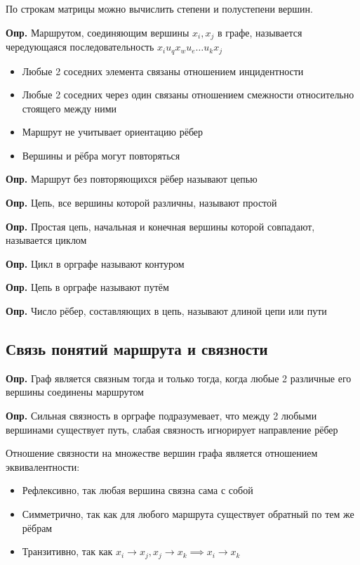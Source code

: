 \documentclass[10pt]{article}
\begin{document}
\par По строкам матрицы можно вычислить степени и полустепени вершин.


\par\textbf{Опр.} Маршрутом, соединяющим вершины $x_{i}, x_{j}$ в графе, называется чередующаяся последовательность $x_{i}u_{q}x_{w}u_{e}\dots u_{k}x_{j}$
\begin{itemize}
    \item Любые 2 соседних элемента связаны отношением инцидентности
    \item Любые 2 соседних через один связаны отношением смежности относительно стоящего между ними
    \item Маршрут не учитывает ориентацию рёбер
    \item Вершины и рёбра могут повторяться
\end{itemize}

\par\textbf{Опр.} Маршрут без повторяющихся рёбер называют цепью
\par\textbf{Опр.} Цепь, все вершины которой различны, называют простой
\par\textbf{Опр.} Простая цепь, начальная и конечная вершины которой совпадают, называется циклом
\par\textbf{Опр.} Цикл в орграфе называют контуром
\par\textbf{Опр.} Цепь в орграфе называют путём
\par\textbf{Опр.} Число рёбер, составляющих в цепь, называют длиной цепи или пути

\subsection*{Связь понятий маршрута и связности}
\par\textbf{Опр.} Граф является связным тогда и только тогда, когда любые 2 различные его вершины соединены маршрутом
\par\textbf{Опр.} Сильная связность в орграфе подразумевает, что между 2 любыми вершинами существует путь, слабая связность игнорирует направление рёбер
\par Отношение связности на множестве вершин графа является отношением эквивалентности:
\begin{itemize}
    \item Рефлексивно, так любая вершина связна сама с собой
    \item Симметрично, так как для любого маршрута существует обратный по тем же рёбрам
    \item Транзитивно, так как $x_{i} \to x_{j}, x_{j} \to x_{k} \implies x_{i} \to x_{k}$
\end{itemize}
\end{document}
